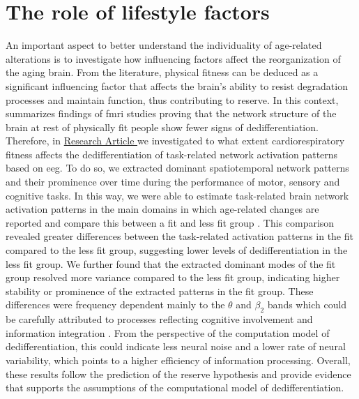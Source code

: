 \section{The role of lifestyle factors}
An important aspect to better understand the individuality of age-related alterations is to investigate how influencing factors affect the reorganization of the aging brain. From the literature, physical fitness can be deduced as a significant influencing factor that affects the brain's ability to resist degradation processes and maintain function, thus contributing to reserve. In this context, \citeauthor{Stillman2019} \cite{Stillman2019} summarizes findings of \gls{fmri} studies proving that the network structure of the brain at rest of physically fit people show fewer signs of dedifferentiation. Therefore, in \hyperref[results:paperIII]{Research Article } we investigated to what extent cardiorespiratory fitness affects the dedifferentiation of task-related network activation patterns based on \gls{eeg}. To do so, we extracted dominant spatiotemporal network patterns and their prominence over time during the performance of motor, sensory and cognitive tasks. In this way, we were able to estimate task-related brain network activation patterns in the main domains in which age-related changes are reported and compare this between a fit and less fit group \cite{Baltes1997, Sala-Llonch2015, Park2009}. This comparison revealed greater differences between the task-related activation patterns in the fit compared to the less fit group, suggesting lower levels of dedifferentiation in the less fit group. We further found that the extracted dominant modes of the fit group resolved more variance compared to the less fit group, indicating higher stability or prominence of the extracted patterns in the fit group. These differences were frequency dependent mainly to the $\theta$ and $\beta_2$ bands which could be carefully attributed to processes reflecting cognitive involvement and information integration \cite{Siegel2012}. From the perspective of the computation model of dedifferentiation, this could indicate less neural noise and a lower rate of neural variability, which points to a higher efficiency of information processing. Overall, these results follow the prediction of the reserve hypothesis and provide evidence that supports the assumptions of the computational model of dedifferentiation.\\
